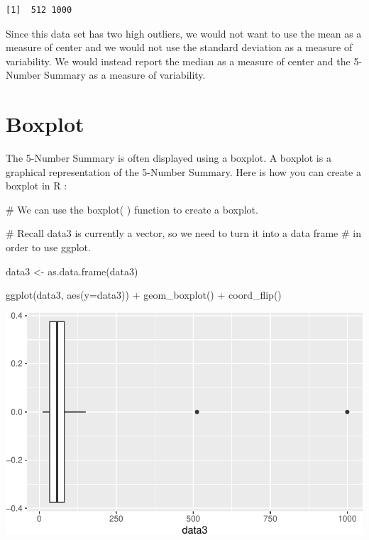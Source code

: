 \documentclass[
  letterpaper,
  DIV=11,
  numbers=noendperiod]{scrreprt}
\newenvironment{Shaded}{\begin{snugshade}}{\end{snugshade}}
\newcommand{\AttributeTok}[1]{\textcolor[rgb]{0.40,0.45,0.13}{#1}}
\newcommand{\CommentTok}[1]{\textcolor[rgb]{0.37,0.37,0.37}{#1}}
\newcommand{\FunctionTok}[1]{\textcolor[rgb]{0.28,0.35,0.67}{#1}}
\newcommand{\NormalTok}[1]{\textcolor[rgb]{0.00,0.23,0.31}{#1}}
\newcommand{\OtherTok}[1]{\textcolor[rgb]{0.00,0.23,0.31}{#1}}
\newcommand{\SpecialCharTok}[1]{\textcolor[rgb]{0.37,0.37,0.37}{#1}}
\begin{document}
\begin{verbatim}
[1]  512 1000
\end{verbatim}

Since this data set has two high outliers, we would not want to use the
mean as a measure of center and we would not use the standard deviation
as a measure of variability. We would instead report the median as a
measure of center and the 5-Number Summary as a measure of variability.

\section*{Boxplot}\label{boxplot}


The 5-Number Summary is often displayed using a boxplot. A boxplot is a
graphical representation of the 5-Number Summary. Here is how you can
create a boxplot in R :

\begin{Shaded}
\begin{Highlighting}[]
\CommentTok{\# We can use the boxplot( ) function to create a boxplot.}

\CommentTok{\# Recall data3 is currently a vector, so we need to turn it into a data frame}
\CommentTok{\# in order to use ggplot.}

\NormalTok{data3 }\OtherTok{\textless{}{-}} \FunctionTok{as.data.frame}\NormalTok{(data3)}

\FunctionTok{ggplot}\NormalTok{(data3, }\FunctionTok{aes}\NormalTok{(}\AttributeTok{y=}\NormalTok{data3)) }\SpecialCharTok{+}
  \FunctionTok{geom\_boxplot}\NormalTok{() }\SpecialCharTok{+}
  \FunctionTok{coord\_flip}\NormalTok{()}
\end{Highlighting}
\end{Shaded}

\includegraphics{Measures_of_Variability_files/figure-pdf/unnamed-chunk-13-1.pdf}
\end{document}
